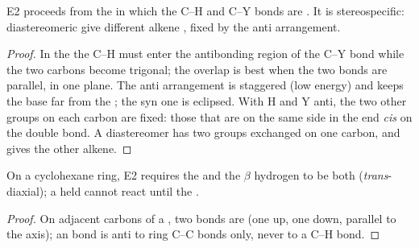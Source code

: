 \begin{proposition}\label{prop:b1:elimination:anti}
E2 proceeds from the  in which the C--H and C--Y bonds are
. It is stereospecific: diastereomeric  give
different alkene , fixed by the anti arrangement.
\end{proposition}

\begin{proof}
In the  the C--H  must enter the
antibonding region of the C--Y bond while the two carbons become
trigonal; the overlap is best when the two bonds are parallel, in one
plane. The anti arrangement is staggered (low energy) and keeps the base
far from the ; the syn one is eclipsed. With H and Y anti,
the two other groups on each carbon are fixed: those that are on the same
side in the  end \textit{cis} on the double bond. A
diastereomer has two groups exchanged on one carbon, and gives the other
alkene.
\end{proof}

\begin{proposition}[E2 on a cyclohexane]\label{prop:b1:elimination:cyclohexane-e2}
On a cyclohexane ring, E2 requires the  and the $\beta$
hydrogen to be both  (\textit{trans}-diaxial); a  held
 cannot react until the .
\end{proposition}

\begin{proof}
On adjacent carbons of a , two  bonds are  (one
up, one down, parallel to the axis); an  bond is anti to ring
C--C bonds only, never to a C--H bond.
\end{proof}

